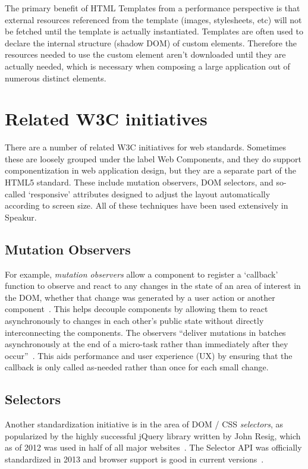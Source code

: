 The primary benefit of HTML Templates from a performance perspective is that external resources referenced from the template (images, stylesheets, etc) will not be fetched until the template is actually instantiated.
Templates are often used to declare the internal structure (shadow DOM) of custom elements. 
Therefore the resources needed to use the custom element aren't downloaded until they are actually needed, which is necessary when composing a large application out of numerous distinct elements.


\section{Related W3C initiatives}
There are a number of related W3C initiatives for web standards. 
Sometimes these are loosely grouped under the label Web Components,
and they do support componentization in web application design, 
but they are a separate part of the HTML5 standard.
These include mutation observers, 
DOM selectors, 
and so-called `responsive' attributes designed to adjust the layout automatically according to screen size.
All of these techniques have been used extensively in Speakur.

\subsection{Mutation Observers}
For example, \textit{mutation observers}
allow a component to register a `callback' function to observe and react to any changes in the state of an area of interest in the DOM, 
whether that change was generated by a user action or another 
component~\cite{w3ccontributors2014}.
This helps decouple components by allowing them to react asynchronously to changes in each other's public state without directly interconnecting the components.
The observers ``deliver mutations in batches asynchronously at the end of a micro-task rather than immediately after they occur''~\cite{addyosmani2014}.
This aids performance and user experience (UX) by ensuring that the callback is only called as-needed rather than once for each small change.

\subsection{Selectors}
Another standardization initiative is in the area of DOM / CSS \textit{selectors},
as popularized by the highly successful jQuery library
written by John Resig, 
which as of 2012 was used in half of all major websites~\cite{matthiasgelbmann2012}.
The Selector API was officially standardized in 2013 and browser support is good in current versions~\cite{w3ccontributors2013}.

